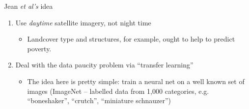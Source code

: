 \documentclass[mathserif]{beamer}
\begin{document}
\begin{frame}{Jean \textit{et al's} idea}
\begin{enumerate}
\item Use \textit{daytime }satellite imagery, not night time
\begin{itemize}
\item Landcover type and structures, for example, ought to help to predict poverty.
\end{itemize}
\item Deal with the data paucity problem via ``transfer learning''
\begin{itemize}
\item The idea here is pretty simple: train a neural net on a well known set of images (ImageNet -- labelled data from 1,000 categories, e.g. ``boneshaker'', ``crutch'', ``miniature schnauzer'')


\end{itemize}
\end{enumerate}
\end{frame}
\end{document}
